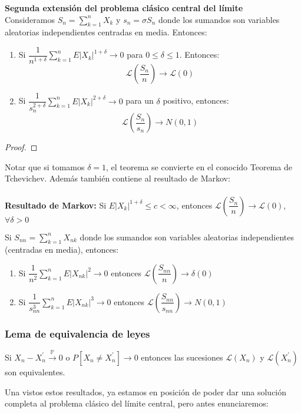 \documentclass[12pt,a4paper]{book}
\begin{document}
\begin{theorem} \textbf{Segunda extensión del problema clásico central del límite}\\

Consideramos $S_n=\displaystyle\sum_{k=1}^n X_k$ y $s_n=\sigma S_n$ donde los sumandos son variables aleatorias independientes centradas en media. Entonces:
\begin{enumerate}
\item Si $\dfrac{1}{n^{1+\delta}}\displaystyle\sum_{k=1}^n E|X_k|^{1+\delta}\rightarrow 0$ para $0\leq\delta\leq 1$. Entonces:
$$\mathcal{L}\left( \frac{S_n}{n} \right)\rightarrow \mathcal{L}(0)$$
\item Si $\dfrac{1}{s_n^{2+\delta}}\displaystyle\sum_{k=1}^n E|X_k|^{2+\delta}\rightarrow 0$ para un $\delta$ positivo, entonces:
$$\mathcal{L}\left( \frac{S_n}{s_n} \right)\rightarrow N(0,1)$$
\end{enumerate}
\end{theorem}
\begin{proof}
\end{proof}
Notar que si tomamos $\delta=1$, el teorema se convierte en el conocido Teorema de Tchevichev. Además también contiene al resultado de Markov:
\\\\
\textbf{Resultado de Markov:} Si $E|X_k|^{1+\delta}\leq c < \infty$, entonces $\mathcal{L}\left( \dfrac{S_n}{n} \right)\rightarrow \mathcal{L}(0)$, $\forall \delta >0$
\begin{lemma}
Si $S_{nn}=\displaystyle\sum_{k=1}^n X_{nk}$ donde los sumandos son variables aleatorias independientes (centradas en media), entonces:
\begin{enumerate}
\item Si $\dfrac{1}{n^2}\displaystyle\sum_{k=1}^n E|X_{nk}|^2\rightarrow 0$ entonces $\mathcal{L} \left( \dfrac{S_{nn}}{n} \right)\rightarrow \delta(0)$
\item Si $\dfrac{1}{s_{nn}^3}\displaystyle\sum_{k=1}^n E|X_{nk}|^3\rightarrow 0$ entonces $\mathcal{L} \left( \dfrac{S_{nn}}{s_{nn}} \right)\rightarrow N(0,1)$
\end{enumerate}
\end{lemma}
\subsubsection{Lema de equivalencia de leyes}
\begin{lemma}
Si $X_n - X_n ^{\prime}  \stackrel{\mathbb{P}}{\longrightarrow} 0$ o $P[X_n \neq X_n^{\prime}]\longrightarrow 0$ entonces las sucesiones $\mathcal{L}(X_n)$ y $\mathcal{L}(X_n^{\prime})$ son equivalentes.
\end{lemma}
Una vistos estos resultados, ya estamos en posición de poder dar una solución completa al problema clásico del límite central, pero antes enunciaremos:
\end{document}
